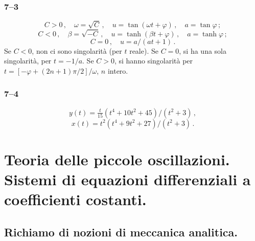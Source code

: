 \documentclass[11pt, a4paper]{book}
\numberwithin{equation}{section}
\begin{document}
\subsection*{7--3}
\[
    C > 0\,, \quad \omega = \sqrt{C}\,, \quad u = \tan(\omega t+\varphi)\,, \quad a = \tan\varphi\,;
\]
\[
    C < 0\,, \quad \beta = \sqrt{-C}\,, \quad u = \tanh(\beta t+\varphi)\,, \quad a = \tanh\varphi\,;
\]
\[
    C = 0\,, \quad u = a/(at+1) \,.
\]
Se $C < 0$, non ci sono singolarità (per $t$ reale). Se $C = 0$, si ha una sola
singolarità, per $t = -1/a$. Se $C > 0$, si hanno singolarità per
$t = [-\varphi + (2n+1)\pi/2]/\omega$, $n$ intero.

\subsection*{7--4}
\[
    y(t) = \tfrac{t}{15}(t^4 + 10t^2 + 45)/(t^2+3) \,,
\]
\[
    x(t) = t^2(t^4 + 9t^2 + 27)/(t^2+3) \,.
\]




\chapter[piccole oscillazioni]{Teoria delle piccole oscillazioni. Sistemi di equazioni differenziali a coefficienti costanti.}

\section{Richiamo di nozioni di meccanica analitica.}
\end{document}
